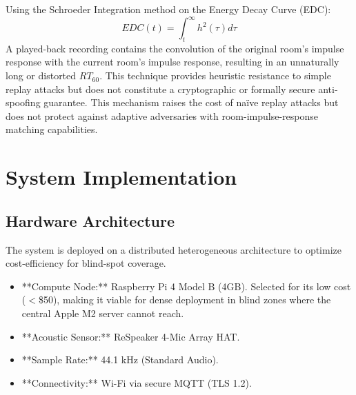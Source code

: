 \documentclass[conference]{IEEEtran}
\begin{document}
Using the Schroeder Integration method on the Energy Decay Curve (EDC):
\begin{equation}
EDC(t) = \int_{t}^{\infty} h^2(\tau) d\tau
\end{equation}
A played-back recording contains the convolution of the original room's impulse response with the current room's impulse response, resulting in an unnaturally long or distorted $RT_{60}$. This technique provides heuristic resistance to simple replay attacks but does not constitute a cryptographic or formally secure anti-spoofing guarantee. This mechanism raises the cost of naïve replay attacks but does not protect against adaptive adversaries with room-impulse-response matching capabilities.

\section{System Implementation}

\begin{center}
\end{center}

\subsection{Hardware Architecture}
The system is deployed on a distributed heterogeneous architecture to optimize cost-efficiency for blind-spot coverage.
\begin{itemize}
    \item **Compute Node:** Raspberry Pi 4 Model B (4GB). Selected for its low cost ($<$\$50), making it viable for dense deployment in blind zones where the central Apple M2 server cannot reach.
    \item **Acoustic Sensor:** ReSpeaker 4-Mic Array HAT.
    \item **Sample Rate:** 44.1 kHz (Standard Audio).
    \item **Connectivity:** Wi-Fi via secure MQTT (TLS 1.2).
\end{itemize}
\end{document}
